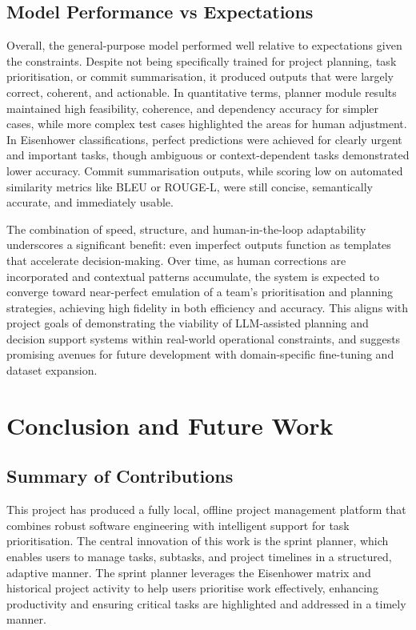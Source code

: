 \documentclass{report}
\begin{document}
\section{Model Performance vs Expectations}

Overall, the general-purpose model performed well relative to expectations given the constraints. Despite not being specifically trained for project planning, task prioritisation, or commit summarisation, it produced outputs that were largely correct, coherent, and actionable. In quantitative terms, planner module results maintained high feasibility, coherence, and dependency accuracy for simpler cases, while more complex test cases highlighted the areas for human adjustment. In Eisenhower classifications, perfect predictions were achieved for clearly urgent and important tasks, though ambiguous or context-dependent tasks demonstrated lower accuracy. Commit summarisation outputs, while scoring low on automated similarity metrics like BLEU or ROUGE-L, were still concise, semantically accurate, and immediately usable.

The combination of speed, structure, and human-in-the-loop adaptability underscores a significant benefit: even imperfect outputs function as templates that accelerate decision-making. Over time, as human corrections are incorporated and contextual patterns accumulate, the system is expected to converge toward near-perfect emulation of a team's prioritisation and planning strategies, achieving high fidelity in both efficiency and accuracy. This aligns with project goals of demonstrating the viability of LLM-assisted planning and decision support systems within real-world operational constraints, and suggests promising avenues for future development with domain-specific fine-tuning and dataset expansion.

\chapter{Conclusion and Future Work}  %
\section{Summary of Contributions}
This project has produced a fully local, offline project management platform that combines robust software engineering with intelligent support for task prioritisation. 
The central innovation of this work is the sprint planner, which enables users to manage tasks, subtasks, and project timelines in a structured, adaptive manner. 
The sprint planner leverages the Eisenhower matrix and historical project activity to help users prioritise work effectively, enhancing productivity and ensuring critical tasks are highlighted and addressed in a timely manner.
\end{document}
